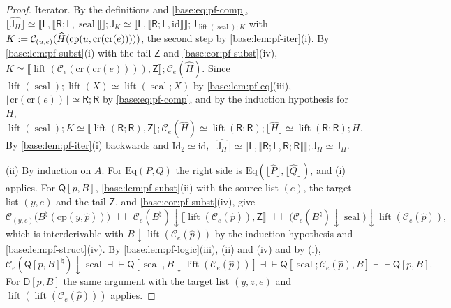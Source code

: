 \begin{proof}
Iterator.  By the definitions and \eqref{base:eq:pf-comp},
$\lfloor\widehat{\mathsf J_H}\rfloor\simeq\llbracket\mathsf L,\llbracket
\mathsf R;\mathsf L,\operatorname{seal}\rrbracket\rrbracket;\mathsf J_K
\simeq\llbracket\mathsf L,\llbracket\mathsf R;\mathsf L,\mathrm{id}\rrbracket\rrbracket;
\mathsf J_{\operatorname{lift}(\operatorname{seal});K}$ with
$K\mathrel{:=}\mathcal C_{(u,e)}(\widehat H(\mathrm{cp}(u,\mathrm{cr}(\mathrm{cr}(e)))))$,
the second step by \cref{base:lem:pf-iter}(i).  By
\cref{base:lem:pf-subst}(i) with the tail $\mathsf Z$ and
\cref{base:cor:pf-subst}(iv),
$K\simeq\llbracket\operatorname{lift}(\mathcal C_e(\mathrm{cr}(\mathrm{cr}(e)))),
\mathsf Z\rrbracket;\mathcal C_e(\widehat H)$.  Since
$\operatorname{lift}(\operatorname{seal});\operatorname{lift}(X)\simeq
\operatorname{lift}(\operatorname{seal};X)$ by \cref{base:lem:pf-eq}(iii),
$\lfloor\mathrm{cr}(\mathrm{cr}(e))\rfloor\simeq\mathsf R;\mathsf R$ by
\eqref{base:eq:pf-comp}, and by the induction hypothesis for $H$,
\[
 \operatorname{lift}(\operatorname{seal});K\simeq
 \llbracket\operatorname{lift}(\mathsf R;\mathsf R),\mathsf Z\rrbracket;
 \mathcal C_e(\widehat H)\simeq\operatorname{lift}(\mathsf R;\mathsf R);
 \lfloor\widehat H\rfloor\simeq\operatorname{lift}(\mathsf R;\mathsf R);H.
\]
By \cref{base:lem:pf-iter}(i) backwards and $\mathrm{Id}_2\simeq\mathrm{id}$,
$\lfloor\widehat{\mathsf J_H}\rfloor\simeq\llbracket\mathsf L,\llbracket
\mathsf R;\mathsf L,\mathsf R;\mathsf R\rrbracket\rrbracket;\mathsf J_H\simeq
\mathsf J_H$.

(ii) By induction on $A$.  For $\mathrm{Eq}(P,Q)$ the right side is
$\mathrm{Eq}(\lfloor\widehat P\rfloor,\lfloor\widehat Q\rfloor)$, and (i)
applies.  For $\mathsf Q[p,B]$, \cref{base:lem:pf-subst}(ii) with the
source list $(e)$, the target list $(y,e)$ and the tail $\mathsf Z$, and
\cref{base:cor:pf-subst}(iv), give
\[
 \mathcal C_{(y,e)}\bigl(B^\natural(\mathrm{cp}(y,\widehat p))\bigr)\dashv\vdash
 \mathcal C_e(B^\natural){\downarrow}\llbracket\operatorname{lift}(\mathcal C_e(\widehat p)),\mathsf Z\rrbracket
 \dashv\vdash\bigl(\mathcal C_e(B^\natural){\downarrow}\operatorname{seal}\bigr)
 {\downarrow}\operatorname{lift}(\mathcal C_e(\widehat p)),
\]
which is interderivable with $B{\downarrow}\operatorname{lift}(\mathcal C_e(\widehat p))$
by the induction hypothesis and \cref{base:lem:pf-struct}(iv).  By
\cref{base:lem:pf-logic}(iii), (ii) and (iv) and by (i),
\[
 \mathcal C_e(\mathsf Q[p,B]^\natural){\downarrow}\operatorname{seal}
 \dashv\vdash\mathsf Q[\operatorname{seal},B{\downarrow}\operatorname{lift}(\mathcal C_e(\widehat p))]
 \dashv\vdash\mathsf Q[\operatorname{seal};\mathcal C_e(\widehat p),B]
 \dashv\vdash\mathsf Q[p,B].
\]
For $\mathsf D[p,B]$ the same argument with the target list $(y,z,e)$ and
$\operatorname{lift}(\operatorname{lift}(\mathcal C_e(\widehat p)))$ applies.


\end{proof}
